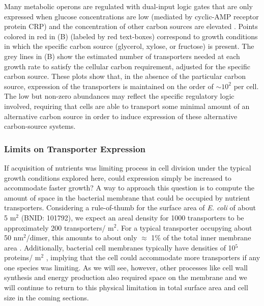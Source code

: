 Many metabolic operons are regulated with dual-input logic gates that are
only expressed when glucose concentrations are low (mediated by cyclic-AMP
receptor protein CRP) and the concentration of other carbon sources are
elevated \citep{gama-castro2016, zhang2014a, gama-castro2016, belliveau2018,
ireland2020}. Points colored in red in (B) (labeled by red
text-boxes) correspond to growth conditions in which the specific carbon
source (glycerol, xylose, or fructose) is present. The grey lines in
(B) show the estimated number of transporters needed at
each growth rate to satisfy the cellular carbon requirement, adjusted for the
specific carbon source. These plots show that, in the absence of the
particular carbon source, expression of the transporters is maintained on the
order of $\sim 10^2$ per cell. The low but non-zero abundances may reflect
the specific regulatory logic involved, requiring that cells are able to
transport some minimal amount of an alternative carbon source in order to
induce expression of these alternative carbon-source systems.

\subsubsection{Limits on Transporter Expression}

If acquisition of nutrients was limiting process in cell division under the
typical growth conditions explored here, could expression simply be increased to
accommodate faster growth? A way to approach this question is to compute the
amount of space in the bacterial membrane that could be occupied by nutrient
transporters. Considering a rule-of-thumb for the surface area of \textit{E.
coli} of about 5 \textmu m$^2$ (BNID: 101792), we expect an areal density for
1000 transporters to be approximately 200 transporters/ \textmu m$^2$. For a
typical transporter occupying about 50 nm$^2$/dimer, this amounts to about only
$\approx$ 1\% of the total inner membrane area \citep{szenk2017}. Additionally,
bacterial cell membranes typically have densities of 10$^5$ proteins/\textmu
m$^2$ \citep{phillips2018}, implying that the cell could accommodate more
transporters if any one species was limiting. As we will see, however, other
processes like cell wall synthesis and energy production also required space on
the membrane and we will continue to return to this physical limitation in total
surface area and cell size in the coming sections.
